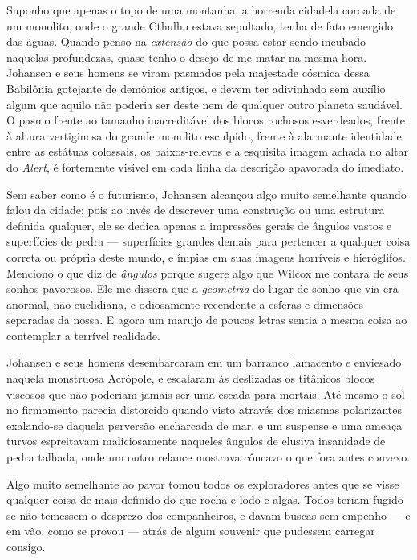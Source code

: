 Suponho que apenas o topo de uma montanha, a horrenda cidadela coroada
de um monolito, onde o grande Cthulhu estava sepultado, tenha de fato
emergido das águas. Quando penso na \emph{extensão} do que possa estar
sendo incubado naquelas profundezas, quase tenho o desejo de me matar na
mesma hora. Johansen e seus homens se viram pasmados pela majestade
cósmica dessa Babilônia gotejante de demônios antigos, e devem ter
adivinhado sem auxílio algum que aquilo não poderia ser deste nem de
qualquer outro planeta saudável. O pasmo frente ao tamanho inacreditável
dos blocos rochosos esverdeados, frente à altura vertiginosa do grande
monolito esculpido, frente à alarmante identidade entre as estátuas
colossais, os baixos-relevos e a esquisita imagem achada no altar do
\emph{Alert}, é fortemente visível em cada linha da descrição apavorada
do imediato.

Sem saber como é o futurismo, Johansen alcançou algo muito semelhante
quando falou da cidade; pois ao invés de descrever uma construção ou uma
estrutura definida qualquer, ele se dedica apenas a impressões gerais de
ângulos vastos e superfícies de pedra --- superfícies grandes demais
para pertencer a qualquer coisa correta ou própria deste mundo, e ímpias
em suas imagens horríveis e hieróglifos. Menciono o que diz de
\emph{ângulos} porque sugere algo que Wilcox me contara de seus sonhos
pavorosos. Ele me dissera que a \emph{geometria} do lugar-de-sonho que
via era anormal, não-euclidiana, e odiosamente recendente a esferas e
dimensões separadas da nossa. E agora um marujo de poucas letras sentia
a mesma coisa ao contemplar a terrível realidade.

Johansen e seus homens desembarcaram em um barranco lamacento e
enviesado naquela monstruosa Acrópole, e escalaram às deslizadas os
titânicos blocos viscosos que não poderiam jamais ser uma escada para
mortais. Até mesmo o sol no firmamento parecia distorcido quando visto
através dos miasmas polarizantes exalando-se daquela perversão
encharcada de mar, e um suspense e uma ameaça turvos espreitavam
maliciosamente naqueles ângulos de elusiva insanidade de pedra talhada,
onde um outro relance mostrava côncavo o que fora antes convexo.

Algo muito semelhante ao pavor tomou todos os exploradores antes que se
visse qualquer coisa de mais definido do que rocha e lodo e algas. Todos
teriam fugido se não temessem o desprezo dos companheiros, e davam
buscas sem empenho --- e em vão, como se provou --- atrás de algum souvenir que pudessem carregar consigo.

